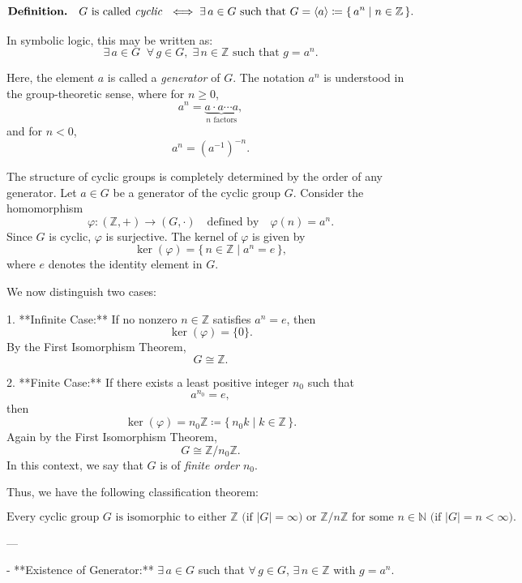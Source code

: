 \documentclass[11pt,openany]{article}
\begin{document}

\[
\textbf{Definition.} \quad G \text{ is called \emph{cyclic} } \iff \exists\, a \in G \text{ such that } G = \langle a \rangle \coloneqq \{\, a^n \mid n \in \mathbb{Z} \,\}.
\]

In symbolic logic, this may be written as:
\[
\exists\, a \in G \;\; \forall\, g \in G,\; \exists\, n \in \mathbb{Z} \text{ such that } g = a^n.
\]

Here, the element \(a\) is called a \emph{generator} of \(G\). The notation \(a^n\) is understood in the group-theoretic sense, where for \(n \ge 0\), 
\[
a^n = \underbrace{a \cdot a \cdots a}_{n\text{ factors}},
\]
and for \(n < 0\), 
\[
a^n = (a^{-1})^{-n}.
\]



The structure of cyclic groups is completely determined by the order of any generator. Let \( a \in G \) be a generator of the cyclic group \(G\). Consider the homomorphism 
\[
\varphi : (\mathbb{Z}, +) \to (G, \cdot) \quad \text{defined by} \quad \varphi(n) = a^n.
\]
Since \( G \) is cyclic, \(\varphi\) is surjective. The kernel of \(\varphi\) is given by
\[
\ker(\varphi) = \{\, n \in \mathbb{Z} \mid a^n = e \,\},
\]
where \(e\) denotes the identity element in \(G\).

We now distinguish two cases:

1. **Infinite Case:**  
If no nonzero \( n \in \mathbb{Z} \) satisfies \( a^n = e \), then
\[
\ker(\varphi) = \{0\}.
\]
By the First Isomorphism Theorem, 
\[
G \cong \mathbb{Z}.
\]

2. **Finite Case:**  
If there exists a least positive integer \( n_0 \) such that
\[
a^{n_0} = e,
\]
then 
\[
\ker(\varphi) = n_0 \mathbb{Z} \coloneqq \{\, n_0 k \mid k \in \mathbb{Z} \,\}.
\]
Again by the First Isomorphism Theorem,
\[
G \cong \mathbb{Z}/n_0 \mathbb{Z}.
\]
In this context, we say that \(G\) is of \emph{finite order} \(n_0\).

Thus, we have the following classification theorem:

\[
\boxed{
	\text{Every cyclic group } G \text{ is isomorphic to either } \mathbb{Z} \text{ (if } |G| = \infty \text{) or } \mathbb{Z}/n\mathbb{Z} \text{ for some } n \in \mathbb{N} \text{ (if } |G| = n < \infty \text{).}
}
\]

---


- **Existence of Generator:**  
\(\exists\, a \in G\) such that \(\forall\, g \in G\), \(\exists\, n \in \mathbb{Z}\) with \(g = a^n\).
\end{document}
